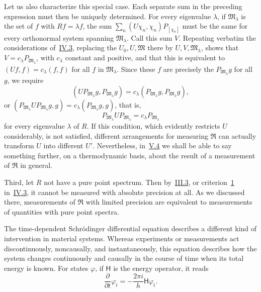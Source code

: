 \documentclass[fontsize=13pt,twoside,openany,headings=normal,parskip=false,bookmarkpackage=false,DIV=calc]{scrbook}
\begin{document}
Let us also characterize this special case. Each separate sum in the preceding expression must then be uniquely determined. For every eigenvalue $\lambda$, if $\mathfrak M_\lambda$ is the set of $f$ with $Rf=\lambda f$, the sum $\sum_n(U\chi_n,\chi_n)P_{[\chi_n]}$ must be the same for every orthonormal system spanning $\mathfrak M_\lambda$. Call this sum $V$. Repeating verbatim the considerations of~\hyperref[sec:IV.3]{IV.3}, replacing the $U_0,U,\mathfrak M$ there by $U,V,\mathfrak M_\lambda$, shows that $V=c_\lambda P_{\mathfrak M_\lambda}$, with $c_\lambda$ constant and positive, and that this is equivalent to $(Uf,f)=c_\lambda(f,f)$ for all $f$ in $\mathfrak M_\lambda$. Since these $f$ are precisely the $P_{\mathfrak M_\lambda}g$ for all $g$, we require
\[
(UP_{\mathfrak M_\lambda}g,P_{\mathfrak M_\lambda}g)
=c_\lambda(P_{\mathfrak M_\lambda}g,P_{\mathfrak M_\lambda}g),
\]
or $(P_{\mathfrak M_\lambda}UP_{\mathfrak M_\lambda}g,g)=c_\lambda(P_{\mathfrak M_\lambda}g,g)$, that is,
\[
P_{\mathfrak M_\lambda}UP_{\mathfrak M_\lambda}=c_\lambda P_{\mathfrak M_\lambda}
\]
for every eigenvalue $\lambda$ of $R$. If this condition, which evidently restricts $U$ considerably, is not satisfied, different arrangements for measuring $\mathfrak R$ can actually transform $U$ into different $U'$. Nevertheless, in~\hyperref[sec:V.4]{V.4} we shall be able to say something further, on a thermodynamic basis, about the result of a measurement of $\mathfrak R$ in general.

Third, let $R$ not have a pure point spectrum. Then by~\hyperref[sec:III.3]{III.3}, or criterion~\hyperref[criterion:IV.3.1]{1} in~\hyperref[sec:IV.3]{IV.3}, it cannot be measured with absolute precision at all. As we discussed there, measurements of $\mathfrak R$ with limited precision are equivalent to measurements of quantities with pure point spectra.

The time-dependent Schr\"odinger differential equation describes a different kind of intervention in material systems. Whereas experiments or measurements act discontinuously, noncausally, and instantaneously, this equation describes how the system changes continuously and causally in the course of time when its total energy is known. For states $\varphi$, if $\mathsf{H}$ is the energy operator, it reads
\begin{equation}\tag{$Z_1$}\label{eq:V.1.Z1}
\frac{\partial}{\partial t}\varphi_t=-\frac{2\pi i}{h}\mathsf{H}\varphi_t.
\end{equation}
\end{document}
